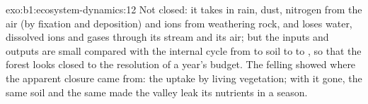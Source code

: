 \begin{solution}{exo:b1:ecosystem-dynamics:12}
Not closed: it takes in rain, dust, nitrogen from the air (by fixation
and deposition) and ions from weathering rock, and loses water,
dissolved ions and gases through its stream and its air; but the
inputs and outputs are small compared with the internal cycle from
 to soil to  to , so that the forest looks closed to
the resolution of a year's budget. The felling showed where the
apparent closure came from: the uptake by living vegetation; with it
gone, the same soil and the same  made the valley leak
its nutrients in a season.
\end{solution}

